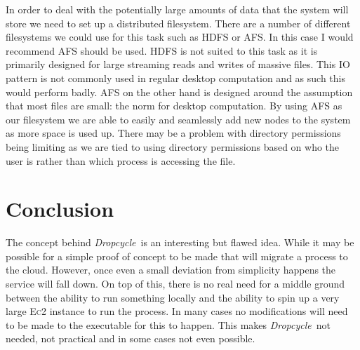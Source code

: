 \documentclass[12pt, a4paper]{article}
\def\dropcycle{\emph{Dropcycle}\ }
\begin{document}
In order to deal with the potentially large amounts of data that the system
will store we need to set up a distributed filesystem. There are a number of
different filesystems we could use for this task such as HDFS or AFS\@. In this
case I would recommend AFS should be used. HDFS is not suited to this task as
it is primarily designed for large streaming reads and writes of massive files.
This IO pattern is not commonly used in regular desktop computation and as such
this would perform badly. AFS on the other hand is designed around the
assumption that most files are small: the norm for desktop computation. By
using AFS as our filesystem we are able to easily and seamlessly add new nodes
to the system as more space is used up. There may be a problem with directory
permissions being limiting as we are tied to using directory permissions based
on who the user is rather than which process is accessing the file.

\section{Conclusion}

The concept behind \dropcycle is an interesting but flawed idea. While it may
be possible for a simple proof of concept to be made that will migrate
a process to the cloud. However, once even a small deviation from simplicity
happens the service will fall down. On top of this, there is no real need for
a middle ground between the ability to run something locally and the ability to
spin up a very large \textsc{Ec2} instance to run the process. In many cases no
modifications will need to be made to the executable for this to happen. This
makes \dropcycle not needed, not practical and in some cases not even possible.

{}

\end{document}
